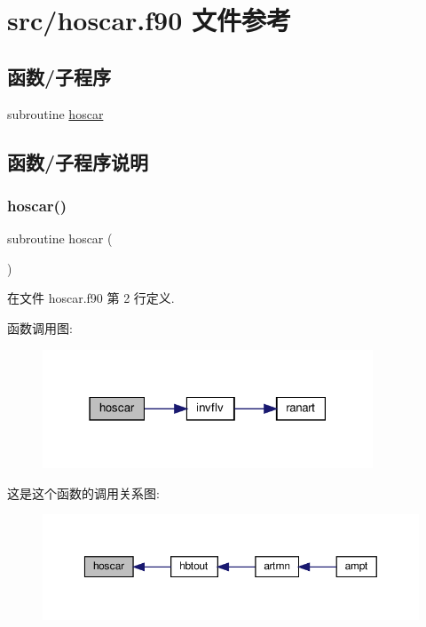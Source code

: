 \hypertarget{hoscar_8f90}{}\section{src/hoscar.f90 文件参考}
\label{hoscar_8f90}
\subsection*{函数/子程序}
\begin{DoxyCompactItemize}
\item 
subroutine \mbox{\hyperlink{hoscar_8f90_a0cdc81fc56ffe13dadf087adb9806c55}{hoscar}}
\end{DoxyCompactItemize}


\subsection{函数/子程序说明}
\mbox{\label{hoscar_8f90_a0cdc81fc56ffe13dadf087adb9806c55}} 
\subsubsection{\texorpdfstring{hoscar()}{hoscar()}}
{\footnotesize\ttfamily subroutine hoscar (\begin{DoxyParamCaption}{ }\end{DoxyParamCaption})}



在文件 hoscar.\+f90 第 2 行定义.

函数调用图\+:
\nopagebreak
\begin{figure}[H]
\begin{center}
\leavevmode
\includegraphics[width=279pt]{hoscar_8f90_a0cdc81fc56ffe13dadf087adb9806c55_cgraph}
\end{center}
\end{figure}
这是这个函数的调用关系图\+:
\nopagebreak
\begin{figure}[H]
\begin{center}
\leavevmode
\includegraphics[width=350pt]{hoscar_8f90_a0cdc81fc56ffe13dadf087adb9806c55_icgraph}
\end{center}
\end{figure}

